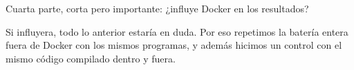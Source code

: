 Cuarta parte, corta pero importante: ¿influye Docker en los resultados?

Si influyera, todo lo anterior estaría en duda. Por eso repetimos la batería entera fuera de Docker con los mismos programas, y además hicimos un control con el mismo código compilado dentro y fuera.
